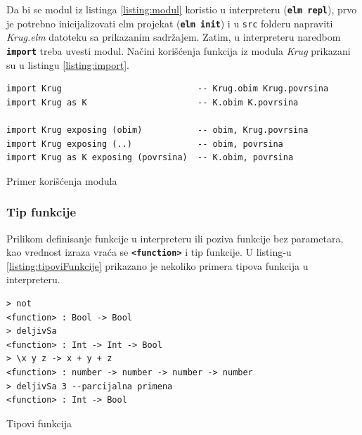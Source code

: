 \documentclass[12pt,oneside]{memoir}
\begin{document}
Da bi se modul iz listinga \ref{listing:modul} koristio u interpreteru (\texttt{\textbf{elm repl}}),
prvo je potrebno inicijalizovati elm projekat (\texttt{\textbf{elm init}}) i u \texttt{src} folderu napraviti 
\emph{Krug.elm} datoteku sa prikazanim sadržajem. Zatim, u interpreteru naredbom 
\texttt{\textbf{import}} treba uvesti modul. Načini korišćenja funkcija iz modula
\emph{Krug} prikazani su u listingu \ref{listing:import}.
\begin{listing}[h]
\begin{verbatim}
import Krug                           -- Krug.obim Krug.povrsina
import Krug as K                      -- K.obim K.povrsina

import Krug exposing (obim)           -- obim, Krug.povrsina
import Krug exposing (..)             -- obim, povrsina
import Krug as K exposing (povrsina)  -- K.obim, povrsina
\end{verbatim}
\caption{Primer korišćenja modula}
\label{listing:import}
\end{listing}

\subsubsection{Tip funkcije}
Prilikom definisanje funkcije u interpreteru ili
poziva funkcije bez parametara, kao vrednost izraza vraća se \texttt{\textbf{<function>}} 
i tip funkcije. U listing-u  \ref{listing:tipoviFunkcije} prikazano je nekoliko primera 
tipova funkcija u interpreteru.
\begin{listing}[h]
\begin{verbatim}
> not
<function> : Bool -> Bool
> deljivSa
<function> : Int -> Int -> Bool
> \x y z -> x + y + z
<function> : number -> number -> number -> number
> deljivSa 3 --parcijalna primena
<function> : Int -> Bool
\end{verbatim}
\caption{Tipovi funkcija}
\label{listing:tipoviFunkcije}
\end{listing} 
  
\end{document}
